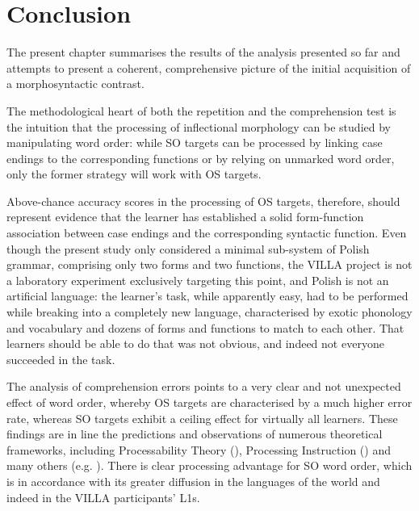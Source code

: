 \chapter{Conclusion}\label{sec:8}

The present chapter summarises the results of the analysis presented so far and attempts to present a coherent, comprehensive picture of the initial acquisition of a morphosyntactic contrast.

The methodological heart of both the repetition and the comprehension test is the intuition that the processing of inflectional morphology can be studied by manipulating word order: while SO targets can be processed by linking case endings to the corresponding functions or by relying on unmarked word order, only the former strategy will work with OS targets. 

\hspace*{-3.4pt}Above-chance accuracy scores in the processing of OS targets, therefore, should represent evidence that the learner has established a solid form-function association between case endings and the corresponding syntactic function. Even though the present study only considered a minimal sub-system of Polish grammar, comprising only two forms and two functions, the VILLA project is not a laboratory experiment exclusively targeting this point, and Polish is not an artificial language: the learner’s task, while apparently easy, had to be performed while breaking into a completely new language, characterised by exotic phonology and vocabulary and dozens of forms and functions to match to each other. That learners should be able to do that was not obvious, and indeed not everyone succeeded in the task.


The analysis of comprehension errors points to a very clear and not unexpected effect of word order, whereby OS targets are characterised by a much higher error rate, whereas SO targets exhibit a ceiling effect for virtually all learners. These findings are in line the predictions and observations of numerous theoretical frameworks, including Processability Theory (\citealt{Pienemann1998, Baten2013, ArtoniMagnani2015}), Processing Instruction (\citealt{VanPatten1984, VanPatten1996, VanPattenEtAl2013}) and many others (e.g. \citealt{KempeMacWhinney1998, Jackson2007, HenryEtAl2009, Rankin2014}). There is clear processing advantage for SO word order, which is in accordance with its greater diffusion in the languages of the world and indeed in the VILLA participants’ L1s.

